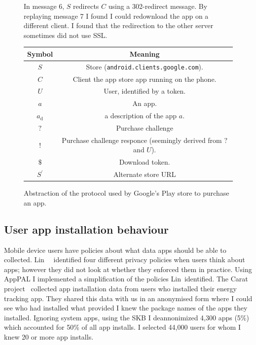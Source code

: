\documentclass[a4paper]{scrartcl}
\begin{document}
\begin{figure}[!h]
\begin{minipage}{0.48\linewidth}
    {\footnotesize In message 6, $S$ redirects $C$ using a 302-redirect message.
      By replaying message 7 I found I could redownload the app on a different client.
      I found that the redirection to the other server sometimes did not use SSL.}
  \end{minipage}
  \begin{minipage}{0.48\linewidth}
    \begin{tabulary}{\linewidth}{cC}
      \toprule
      Symbol         & Meaning                                                           \\
      \midrule
      $S$            & Store (\texttt{android.clients.google.com}).                      \\
      $C$            & Client the app store app running on the phone.                    \\
      $U$            & User, identified by a token.                                      \\
      $a$            & An app.                                                           \\
      $a_{\text{d}}$ & a description of the app $a$.                                     \\
      $?$            & Purchase challenge                                                \\
      $!$            & Purchase challenge responce (seemingly derived from $?$ and $U$). \\
      $\$$           & Download token.                                                   \\
      $S^\prime$     & Alternate store URL                                               \\
      \bottomrule
    \end{tabulary}
  \end{minipage}
  \caption{Abstraction of the protocol used by Google's Play store to purchase an app.}
  \label{fig:protocol}
\end{figure}

\subsection{User app installation behaviour}

Mobile device users have policies about what data apps should be able to collected.
Lin~\etal~\citep{Sadeh:2014vq} identified four different privacy policies when users think about apps; however they did not look at whether they enforced them in practice.
Using AppPAL I implemented a simplification of the policies Lin~\etal identified.
The Carat project~\citep{Oliner:2013ht} collected app installation data from users who installed their energy tracking app.
They shared this data with us in an anonymised form where I could see who had installed what provided I knew the package names of the apps they installed.
Ignoring system apps, using the \ac{SKB} I deannonimized 4,300 apps (5\%) which accounted for 50\% of all app installs.
I selected 44,000 users for whom I knew 20 or more app installs.
\end{document}
